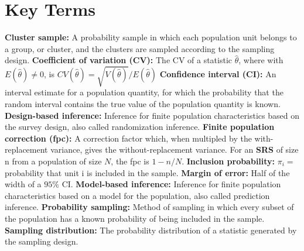 \documentclass[a4paper,twoside,11pt]{article}
\begin{document}
\section{Key Terms}
\textbf{Cluster sample:} A probability sample in which each population unit belongs to a group, or cluster, and the clusters are sampled according to the sampling design.
\newline
\newline
\textbf{Coefficient of variation (CV):} The CV of a statistic $\hat{\theta}$, where with $E(\hat{\theta}) \ne 0$, is $CV(\hat{\theta}) = \sqrt{V(\hat{\theta})}/E(\hat{\theta})$
\newline
\newline
\textbf{Confidence interval (CI):} An interval estimate for a population quantity, for which the probability that the random interval contains the true value of the population quantity is known.
\newline
\newline
\textbf{Design-based inference:} Inference for finite population characteristics based on the survey design, also called randomization inference.
\newline
\newline
\textbf{Finite population correction (fpc):} A correction factor which, when multipled by the with-replacement variance, gives the without-replacement variance. For an \textbf{SRS} of size n from a population of size $N$, the fpc is $1-n/N$.
\newline
\newline
\textbf{Inclusion probability:} $\pi_i=$ probability that unit i is included in the sample. 
\newline
\newline
\textbf{Margin of error:} Half of the width of a $95\%$ CI.
\newline
\newline
\textbf{Model-based inference:} Inference for finite population characteristics based on a model for the population, also called prediction inference.
\newline
\newline
\textbf{Probability sampling:} Method of sampling in which every subset of the population has a known probability of being included in the sample.
\newline
\newline
\textbf{Sampling distribution:} The probability distribution of a statistic generated by the sampling design.
\newline
\end{document}

